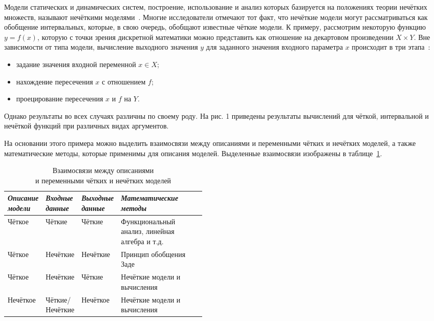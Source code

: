 Модели статических и динамических систем, построение, использование и анализ которых базируется на положениях теории нечётких множеств, называют нечёткими моделями~\cite{Borisov_Fedulov}. Многие исследователи отмечают тот факт, что нечёткие модели могут рассматриваться как обобщение интервальных, которые, в свою очередь, обобщают известные чёткие модели. К примеру, рассмотрим некоторую функцию $y=f \left(x \right)$, которую с точки зрения дискретной математики можно представить как отношение на декартовом произведении $X \times Y$. Вне зависимости от типа модели, вычисление выходного значения $y$ для заданного значения входного параметра $x$ происходит в три этапа~\cite{Borisov_Fedulov}:
\begin{itemize}
	\item задание значения входной переменной $x \in X$;
	\item нахождение пересечения $x$ с отношением $f$;
	\item проецирование пересечения $x$ и $f$ на $Y$.
\end{itemize}

Однако результаты во всех случаях различны по своему роду. На рис. 1 приведены результаты вычислений для чёткой, интервальной и нечёткой функций при различных видах аргументов. 

На основании этого примера можно выделить взаимосвязи между описаниями и переменными чётких и нечётких моделей, а также математические методы, которые применимы для описания моделей. Выделенные взаимосвязи изображены в таблице~\ref{t:fuzzy-modeling-approaches}.
\begin{table}[h!]
\caption{Взаимосвязи между описаниями \\ и переменными чётких и нечётких моделей}
\label{t:fuzzy-modeling-approaches}
\begin{center}
\begin{tabularx}{\textwidth}{|p{0.15\linewidth}|p{0.15\linewidth}|p{0.15\linewidth}|X|}
	\hline
		\centering \textit{Описание модели} & \centering \textit{Входные данные} & \centering \textit{Выходные данные} & \centering \textit{Математические методы} \tabularnewline	\hline
	\hline
		Чёткое & Чёткие & Чёткие & Функциональный анализ, линейная алгебра и т.д. \tabularnewline
	\hline
		Чёткое & Нечёткие & Нечёткие & Принцип обобщения Заде \tabularnewline
	\hline
		Чёткое & Нечёткие & Чёткие & Нечёткие модели и вычисления \tabularnewline
	\hline
		Нечёткое & Чёткие/\allowbreak Нечёткие & Нечёткое & Нечёткие модели и вычисления \tabularnewline
  \hline
\end{tabularx}
\end{center}
\end{table}

